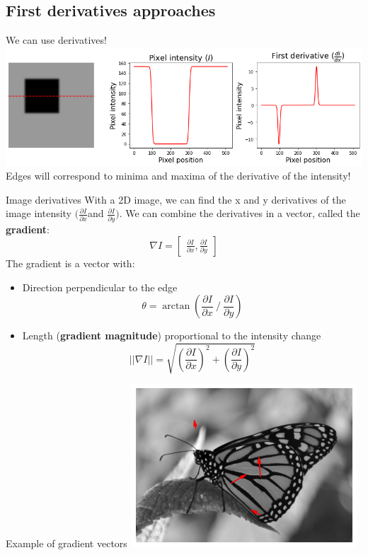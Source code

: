 \documentclass[9pt, aspectratio=169]{beamer}
\begin{document}
\subsection{First derivatives approaches}

\begin{frame}
    {We can use derivatives!}
    \includegraphics[width=\textwidth]{intensity_derivative.png}
    Edges will correspond to minima and maxima of the derivative of the intensity!
\end{frame}

\begin{frame}
    {Image derivatives}
    With a 2D image, we can find the x and y derivatives of the image intensity \huge$(\frac{\partial I}{\partial x} $\normalsize and \huge$\frac{\partial I}{\partial y})$.
    \normalsize
    We can combine the derivatives in a vector, called the \textbf{gradient}:
    \huge{
        $$\nabla I = \begin{bmatrix}\frac{\partial I}{\partial x}, \frac{\partial I}{\partial y}\end{bmatrix}$$}
    \pause
    \normalsize
    The gradient is a vector with:
    \begin{itemize}
        \item Direction perpendicular to the edge
              \Large{
                  $$\theta = \arctan\left(\frac{\partial I}{\partial x} \mathbin{/} \frac{\partial I}{\partial y}\right)$$}
              \pause
              \normalsize
        \item Length (\textbf{gradient magnitude}) proportional to the intensity change
              \Large{
                  $$\lvert\lvert\nabla I\rvert\rvert = \sqrt{\left(\frac{\partial I}{\partial x}\right)^2 + \left(\frac{\partial I}{\partial y}\right)^2}$$}
    \end{itemize}
\end{frame}

\begin{frame}
    {Example of gradient vectors}
    \centering
    \includegraphics[width=.7\textwidth]{monarch_gradient.png}
\end{frame}
\end{document}
